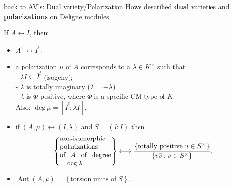 \documentclass[usenames,dvipsnames]{beamer}
\DeclareMathOperator{\Aut}{Aut}
\newcommand{\set}[1]{\left\lbrace#1\right\rbrace }
\begin{document}
\begin{frame}{ back to AV's: Dual variety/Polarization }
Howe described \textbf{dual} varieties and \textbf{polarizations} on Deligne modules.
\begin{theorem}[M.]
   If $A\leftrightarrow I$, then:
   \begin{itemize}
      \pause \item $A^\vee \leftrightarrow \overline{I}^t$.
      \pause \item a polarization $\mu$ of $A$ corresponds to a $\lambda\in K^\times$ such that\\
	    - $\lambda I \subseteq \overline{I}^t$ (isogeny);\\
	    - $\lambda$ is totally imaginary ($\overline \lambda = -\lambda$);\\
	    - $\lambda$ is $\Phi$-positive, where $\Phi$ is a specific CM-type of $K$.\\ 
      Also: $\deg \mu= [\overline{I}^t : \lambda I]$.
      \pause  \item if $(A,\mu) \leftrightarrow (I,\lambda)$ and $S=(I:I)$ then
     \vspace{-0.5em}
	      \[\set{\parbox[p]{7.5em}{non-isomorphic polarizations of $A$ of degree $=\deg\lambda$}} \longleftrightarrow \dfrac{\set{\text{totally positive }u\in S^\times }}{\set{v\overline{v}: v\in S^\times}}.\]
     \vspace{-1.5em}
	 \pause \item  $\Aut(A,\mu) = \set{\text{torsion units of $S$}}$.
\end{itemize}
\end{theorem}
\end{frame}
\end{document}
